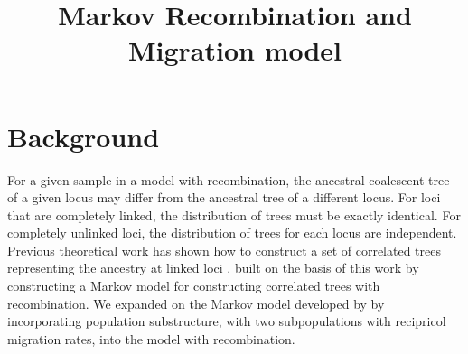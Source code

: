 \documentclass[11pt,oneside]{amsart}
\begin{document}
\linenumbers

\theoremstyle{plain}
\newtheorem{theorem}{Theorem}[section]
\newtheorem{lemma}[theorem]{Lemma}
\newtheorem{corollary}[theorem]{Corollary}
\newtheorem{proposition}[theorem]{Proposition}
\newtheorem{definition}[theorem]{Definition}

\title{Markov Recombination and Migration model}

\maketitle

%
%
%
%

\section{Background}

For a given sample in a model with recombination, the ancestral coalescent tree of a given locus may differ from the ancestral tree of a different locus. For loci that are completely linked, the distribution of trees must be exactly identical. For completely unlinked loci, the distribution of trees for each locus are independent. Previous theoretical work has shown how to construct a set of correlated trees representing the ancestry at linked loci \citep{Hudson1983, Hudson1990, GriffithsMarjoram1996}. \cite{SimonsenChurchill1997} built on the basis of this work by constructing a Markov model for constructing correlated trees with recombination. We expanded on the Markov model developed by \cite{SimonsenChurchill1997} by incorporating population substructure, with two subpopulations with recipricol migration rates, into the model with recombination.
\end{document}
